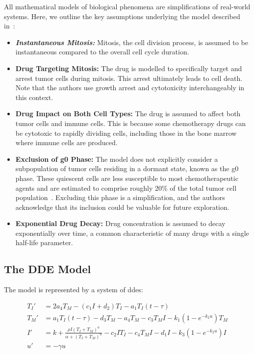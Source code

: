 All mathematical models of biological phenomena are simplifications of real-world systems. Here, we outline the key assumptions underlying the model described in~\cite{villasana2003}:

\begin{itemize}
    \item \textbf{\textit{Instantaneous Mitosis:}} Mitosis, the cell division process, is assumed to be instantaneous compared to the overall cell cycle duration.
    \item \textbf{Drug Targeting Mitosis:} The drug is modelled to specifically target and arrest tumor cells during mitosis. This arrest ultimately leads to cell death. Note that the authors use \gls{growth arrest} and cytotoxicity interchangeably in this context.
    \item \textbf{Drug Impact on Both Cell Types:} The drug is assumed to affect both tumor cells and immune cells. This is because some \gls{chemotherapy} drugs can be cytotoxic to rapidly dividing cells, including those in the bone marrow where immune cells are produced.~\cite{villasana2003}
    \item \textbf{Exclusion of \gls{g0} Phase: } The model does not explicitly consider a subpopulation of tumor cells residing in a dormant state, known as the \gls{g0} phase. These quiescent cells are less susceptible to most chemotherapeutic agents and are estimated to comprise roughly 20\% of the total tumor cell population~\cite{villasana2003}. Excluding this phase is a simplification, and the authors acknowledge that its inclusion could be valuable for future exploration.
    \item \textbf{Exponential Drug Decay: } Drug concentration is assumed to decay exponentially over time, a common characteristic of many drugs with a single \gls{half-life} parameter. 
\end{itemize}

\subsection{The DDE Model} \label{the model}

The model is represented by a system of \gls{dde}s:

\begin{align*}
    T_I' &= 2a_4T_M-(c_1I + d_2)T_I-a_1T_I(t-\tau)\\
    T_M' &= a_1T_I(t-\tau)-d_3T_M - a_4T_M - c_3T_MI-k_1(1-e^{-k_2u})T_M\\
    I' &= k + \frac{\rho I (T_I + T_M)^n}{\alpha + (T_I + T_M)^n} - c_2IT_I - c_4T_MI -d_1I - k_3(1-e^{-k_2u})I\\
    u' &= -\gamma u
\end{align*}


